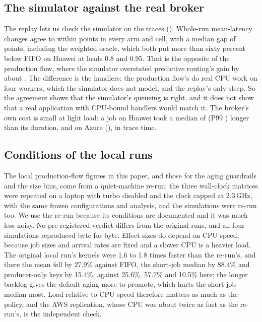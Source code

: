 

\subsection{The simulator against the real broker}\label{sec:simreplay}

The replay lets us check the simulator on the traces (). Whole-run mean-latency changes agree to within \SimReplayGapMax{} points in every arm and cell, with a median gap of \SimReplayGapMedian{} points, including the weighted oracle, which both put more than sixty percent below FIFO on Huawei at loads 0.8 and 0.95. That is the opposite of the production flow, where the simulator overstated predictive routing's gain by about \SimValOverstatePct{}. The difference is the handlers: the production flow's do real CPU work on four workers, which the simulator does not model, and the replay's only sleep. So the agreement shows that the simulator's queueing is right, and it does not show that a real application with CPU-bound handlers would match it. The broker's own cost is small at light load: a job on Huawei took a median of \ReplayProbeHuaweiMedian{} (P99 \ReplayProbeHuaweiPNinetyNine{}) longer than its duration, and on Azure \ReplayProbeAzureMedian{} (\ReplayProbeAzurePNinetyNine{}), in trace time.



\subsection{Conditions of the local runs}

The local production-flow figures in this paper, and those for the aging guardrails and the size bins, come from a quiet-machine re-run: the three wall-clock matrices were repeated on a laptop with turbo disabled and the clock capped at 2.3\,GHz, with the same frozen configurations and analysis, and the simulations were re-run too. We use the re-run because its conditions are documented and it was much less noisy. No pre-registered verdict differs from the original runs, and all four simulations reproduced byte for byte. Effect sizes do depend on CPU speed, because job sizes and arrival rates are fixed and a slower CPU is a heavier load. The original local run's kernels were 1.6 to 1.8 times faster than the re-run's, and there the mean fell by 27.9\% against FIFO, the short-job median by 88.4\% and producer-only keys by 15.4\%, against 25.6\%, 57.7\% and 10.5\% here; the longer backlog gives the default aging more to promote, which hurts the short-job median most. Load relative to CPU speed therefore matters as much as the policy, and the AWS replication, whose CPU was about twice as fast as the re-run's, is the independent check.
